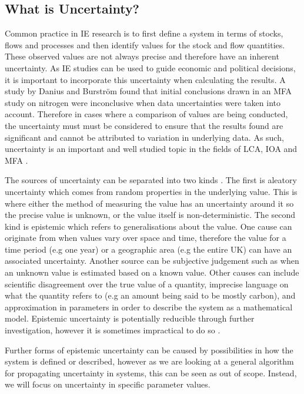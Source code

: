 \documentclass[ %
                    author={Tom Jager},
                supervisor={Dr. Daniel Schien},
                    degree={MEng},
                     title={A Bayesian Inference Engine for Calibrating Uncertainty over UMIS Structured MFA Systems},
                  subtitle={},
                      type={research},
                      year={2019} ]{dissertation}
\begin{document}
\subsection{What is Uncertainty?}
Common practice in IE research is to first define a system in terms of stocks, flows and processes and then identify values for the stock and flow quantities. These observed values are not always precise and therefore have an inherent uncertainty. As IE studies can be used to guide economic and political decisions, it is important to incorporate this uncertainty when calculating the results. A study by Danius and Burstr\"om \cite{danius2001regional} found that initial conclusions drawn in an MFA study on nitrogen were inconclusive when data uncertainties were taken into account. Therefore in cases where a comparison of values are being conducted, the uncertainty must must be considered to ensure that the results found are significant and cannot be attributed to variation in underlying data. As such, uncertainty is an important and well studied topic in the fields of LCA, IOA and MFA \cite{temursho201712, laner2014systematic, heijungs2004review}.

The sources of uncertainty can be separated into two kinds \cite{ferson1996different}. The first is aleatory uncertainty which comes from random properties in the underlying value. This is where either the method of measuring the value has an uncertainty around it so the precise value is unknown, or the value itself is non-deterministic. The second kind is epistemic which refers to generalisations about the value. One cause can originate from when values vary over space and time, therefore the value for a time period (e.g one year) or a geographic area (e.g the entire UK) can have an associated uncertainty. Another source can be subjective judgement such as when an unknown value is estimated based on a known value. Other causes can include scientific disagreement over the true value of a quantity, imprecise language on what the quantity refers to (e.g an amount being said to be mostly carbon), and approximation in parameters in order to describe the system as a mathematical model. Epistemic uncertainty is potentially reducible through further investigation, however it is sometimes impractical to do so \cite{laner2014systematic}.

Further forms of epistemic uncertainty can be caused by possibilities in how the system is defined or described, however as we are looking at a general algorithm for propagating uncertainty in systems, this can be seen as out of scope. Instead, we will focus on uncertainty in specific parameter values.
\end{document}
